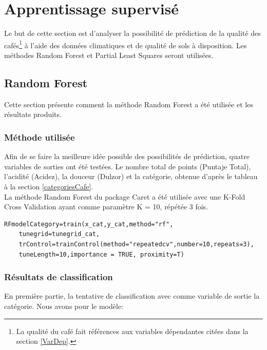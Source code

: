 \newpage

\section{Apprentissage supervisé}
Le but de cette section est d'analyser la possibilité de prédiction de la qualité des cafés\footnote{La qualité du café fait références aux variables dépendantes citées dans la section \ref{VarDep}.} à l'aide des données climatiques et de qualité de sols à disposition. Les méthodes Random Forest et Partial Least Squares seront utilisées.


\subsection{Random Forest}
 
Cette section présente comment la méthode Random Forest a été utilisée et les résultats produits. 
\subsubsection{Méthode utilisée}
Afin de se faire la meilleure idée possible des possibilités de prédiction, quatre variables de sorties ont été testées. Le nombre total de points (Puntaje Total), l'acidité (Acidez), la douceur (Dulzor) et la catégorie, obtenue d'après le tableau à la section \ref{categoriesCafe}. \\

\noindent La méthode Random Forest du package Caret a été utilisée avec une K-Fold Cross Validation ayant comme paramètre K = 10, répétée 3 fois. 

\begin{lstlisting}[caption={Fonction d'entrainement et de test du modèle avec Random Forest},captionpos=b]
	RFmodelCategory=train(x_cat,y_cat,method="rf",
	tunegrid=tunegrid_cat,
	trControl=trainControl(method="repeatedcv",number=10,repeats=3),
	tuneLength=10,importance = TRUE, proximity=T)
\end{lstlisting}




\newpage
\subsubsection{Résultats de classification}
En première partie, la tentative de classification avec comme variable de sortie la catégorie. Nous avons pour le modèle:

